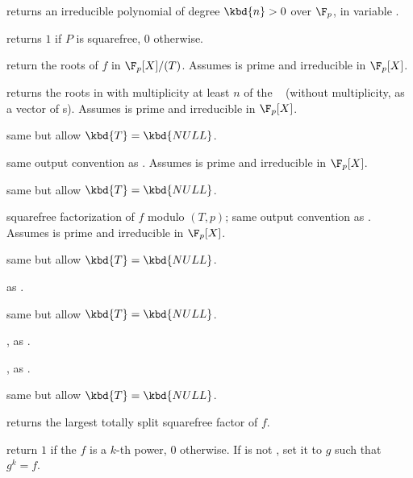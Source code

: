 
 returns an irreducible polynomial
of degree $\kbd{n} > 0$ over $\F_p$, in variable .

 returns $1$ if $P$ is
squarefree, $0$ otherwise.


 return the roots of $f$ in
$\F_p[X]/(T)$. Assumes  is prime and  irreducible in $\F_p[X]$.

returns the roots in  with multiplicity at least $n$ of
the ~ (without multiplicity, as a vector of s).
Assumes  is prime and  irreducible in $\F_p[X]$.

 same but allow $\kbd{T} = \kbd{NULL}$.

 same output convention as
. Assumes  is prime and  irreducible
in $\F_p[X]$.

 same but allow $\kbd{T} = \kbd{NULL}$.

 squarefree
factorization of $f$ modulo $(T,p)$; same output convention as
. Assumes  is prime and 
irreducible in $\F_p[X]$.

 same but allow
$\kbd{T} = \kbd{NULL}$.

 as .

 same but allow $\kbd{T} = \kbd{NULL}$.

, as
.

, as .

 same but allow
$\kbd{T} = \kbd{NULL}$.

 returns the largest totally
split squarefree factor of $f$.

return $1$ if the  $f$ is a $k$-th power, $0$ otherwise.
If  is not , set it to $g$ such that $g^k = f$.


